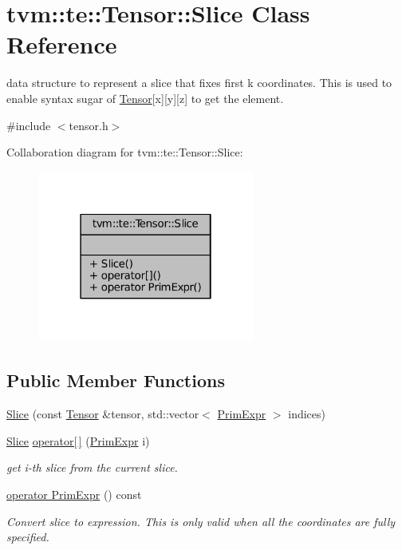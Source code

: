 \hypertarget{classtvm_1_1te_1_1Tensor_1_1Slice}{}\section{tvm\+:\+:te\+:\+:Tensor\+:\+:Slice Class Reference}
\label{classtvm_1_1te_1_1Tensor_1_1Slice}


data structure to represent a slice that fixes first k coordinates. This is used to enable syntax sugar of \hyperlink{classtvm_1_1te_1_1Tensor}{Tensor}\mbox{[}x\mbox{]}\mbox{[}y\mbox{]}\mbox{[}z\mbox{]} to get the element.  




{\ttfamily \#include $<$tensor.\+h$>$}



Collaboration diagram for tvm\+:\+:te\+:\+:Tensor\+:\+:Slice\+:
\nopagebreak
\begin{figure}[H]
\begin{center}
\leavevmode
\includegraphics[width=202pt]{classtvm_1_1te_1_1Tensor_1_1Slice__coll__graph}
\end{center}
\end{figure}
\subsection*{Public Member Functions}
\begin{DoxyCompactItemize}
\item 
\hyperlink{classtvm_1_1te_1_1Tensor_1_1Slice_ab314819e8bcca6421e9a4f33e48578c3}{Slice} (const \hyperlink{classtvm_1_1te_1_1Tensor}{Tensor} \&tensor, std\+::vector$<$ \hyperlink{classtvm_1_1PrimExpr}{Prim\+Expr} $>$ indices)
\item 
\hyperlink{classtvm_1_1te_1_1Tensor_1_1Slice}{Slice} \hyperlink{classtvm_1_1te_1_1Tensor_1_1Slice_a1a00e3ec5f80973c337b0e7ab9c0974d}{operator\mbox{[}$\,$\mbox{]}} (\hyperlink{classtvm_1_1PrimExpr}{Prim\+Expr} i)
\begin{DoxyCompactList}\small\item\em get i-\/th slice from the current slice. \end{DoxyCompactList}\item 
\hyperlink{classtvm_1_1te_1_1Tensor_1_1Slice_a52250a6adf8e78cde22dd34d1d5baaee}{operator Prim\+Expr} () const 
\begin{DoxyCompactList}\small\item\em Convert slice to expression. This is only valid when all the coordinates are fully specified. \end{DoxyCompactList}\end{DoxyCompactItemize}


